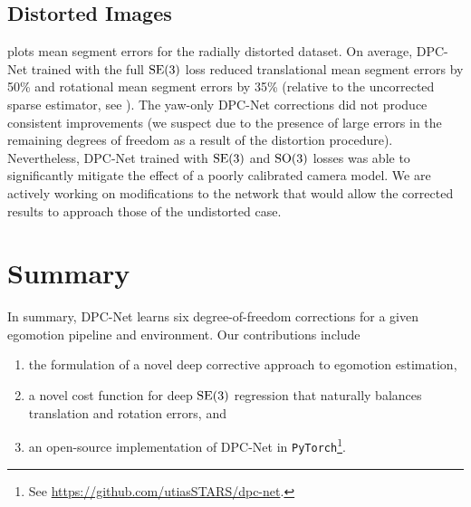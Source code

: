 \subsection{Distorted Images}

 plots mean segment errors for the radially distorted dataset. On average, DPC-Net trained with the full $\mathrm{SE}(3)$ loss reduced translational mean segment errors by 50\% and rotational mean segment errors by 35\% (relative to the uncorrected sparse estimator, see ). The yaw-only DPC-Net corrections did not produce consistent improvements (we suspect due to the presence of large errors in the remaining degrees of freedom as a result of the distortion procedure). Nevertheless, DPC-Net trained with $\mathrm{SE}(3)$ and $\mathrm{SO}(3)$ losses was able to significantly mitigate the effect of a poorly calibrated camera model. We are actively working on modifications to the network that would allow the corrected results to approach those of the undistorted case.



\section{Summary}

In summary, DPC-Net learns six degree-of-freedom corrections for a given egomotion pipeline and environment. Our contributions include

\begin{enumerate}
	\item the formulation of a novel deep corrective approach to egomotion estimation,
	\item a novel cost function for deep $\mathrm{SE}(3)$ regression that naturally balances translation and rotation errors, and
	\item an open-source implementation of DPC-Net in \texttt{PyTorch}\footnote{See \url{https://github.com/utiasSTARS/dpc-net}.}.
\end{enumerate}


